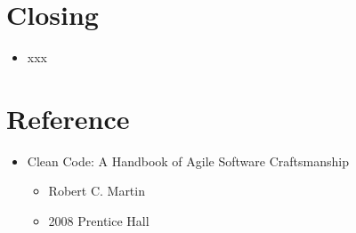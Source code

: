 \documentclass[12pt, xcolor=table, dvipsnames]{beamer}
\begin{document}

\section{Closing}
\begin{frame}{\secname{} }
    \begin{itemize}[<+->]
        \item xxx
    \end{itemize}
\end{frame}

\section{Reference}
\begin{frame}{\secname{}}
    \begin{itemize}[<*>]
        \item Clean Code: A Handbook of Agile Software Craftsmanship
        \begin{itemize}[<*>] 
        \item Robert C. Martin
        \item 2008 Prentice Hall
        \end{itemize} 
     \end{itemize}
\end{frame}
\end{document}
